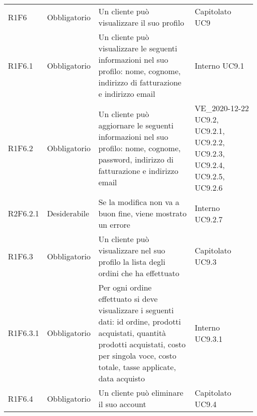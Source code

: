 {\begin{longtable}{C{2.5cm} C{2.8cm} C{6.7cm} C{2.5cm}}
R1F6 & Obbligatorio & Un cliente può visualizzare il suo profilo & Capitolato \newline UC9 \\
R1F6.1 & Obbligatorio & Un cliente può visualizzare le seguenti informazioni nel suo profilo: nome, cognome, indirizzo di fatturazione e indirizzo email & Interno \newline UC9.1\\
R1F6.2 & Obbligatorio & Un cliente può aggiornare le seguenti informazioni nel suo profilo: nome, cognome, password, indirizzo di fatturazione e indirizzo email & VE\_2020-12-22 \newline UC9.2, UC9.2.1, UC9.2.2, UC9.2.3, UC9.2.4, UC9.2.5, UC9.2.6 \\
R2F6.2.1 & Desiderabile & Se la modifica non va a buon fine, viene mostrato un errore & Interno UC9.2.7\\
R1F6.3 & Obbligatorio & Un cliente può visualizzare nel suo profilo la lista degli ordini che ha effettuato & Capitolato \newline UC9.3\\
R1F6.3.1 & Obbligatorio & Per ogni ordine effettuato si deve visualizzare i seguenti dati: id ordine, prodotti acquistati, quantità prodotti acquistati, costo per singola voce, costo totale, tasse applicate, data acquisto & Interno \newline UC9.3.1\\
R1F6.4 & Obbligatorio & Un cliente può eliminare il suo account & Capitolato \newline UC9.4\\



\end{longtable}}
